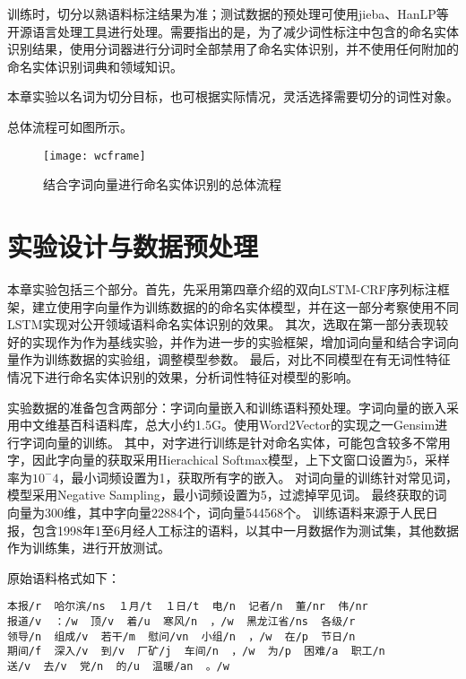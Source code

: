 训练时，切分以熟语料标注结果为准；测试数据的预处理可使用jieba、HanLP等开源语言处理工具进行处理。需要指出的是，为了减少词性标注中包含的命名实体识别结果，使用分词器进行分词时全部禁用了命名实体识别，并不使用任何附加的命名实体识别词典和领域知识。

本章实验以名词为切分目标，也可根据实际情况，灵活选择需要切分的词性对象。

总体流程可如图\label{fig:exp_frame}所示。
\begin{figure}[H]
    \centering
    \texttt{[image: wcframe]}
    \caption{结合字词向量进行命名实体识别的总体流程}
    \label{fig:exp_frame}
\end{figure}

\section{实验设计与数据预处理}
本章实验包括三个部分。首先，先采用第四章介绍的双向LSTM-CRF序列标注框架，建立使用字向量作为训练数据的的命名实体模型，并在这一部分考察使用不同LSTM实现对公开领域语料命名实体识别的效果。
其次，选取在第一部分表现较好的实现作为作为基线实验，并作为进一步的实验框架，增加词向量和结合字词向量作为训练数据的实验组，调整模型参数。
最后，对比不同模型在有无词性特征情况下进行命名实体识别的效果，分析词性特征对模型的影响。


实验数据的准备包含两部分：字词向量嵌入和训练语料预处理。字词向量的嵌入采用中文维基百科语料库，总大小约1.5G。使用Word2Vector的实现之一Gensim进行字词向量的训练。
其中，对字进行训练是针对命名实体，可能包含较多不常用字，因此字向量的获取采用Hierachical Softmax模型，上下文窗口设置为5，采样率为$10^-4$，最小词频设置为1，获取所有字的嵌入。
对词向量的训练针对常见词，模型采用Negative Sampling，最小词频设置为5，过滤掉罕见词。
最终获取的词向量为300维，其中字向量22884个，词向量544568个。
训练语料来源于人民日报，包含1998年1至6月经人工标注的语料，以其中一月数据作为测试集，其他数据作为训练集，进行开放测试。

原始语料格式如下：

\begin{verbatim}
本报/r  哈尔滨/ns  １月/t  １日/t  电/n  记者/n  董/nr  伟/nr
报道/v  ：/w  顶/v  着/u  寒风/n  ，/w  黑龙江省/ns  各级/r
领导/n  组成/v  若干/m  慰问/vn  小组/n  ，/w  在/p  节日/n
期间/f  深入/v  到/v  厂矿/j  车间/n  ，/w  为/p  困难/a  职工/n
送/v  去/v  党/n  的/u  温暖/an  。/w
\end{verbatim}


